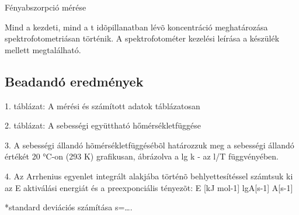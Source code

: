 \documentclass[a4paper, 12pt]{article}
\begin{document}
Fényabszorpció mérése


Mind a kezdeti, mind a t idõpillanatban lévõ koncentráció meghatározása spektrofotometriásan történik.
A spektrofotométer kezelési leírása a készülék mellett megtalálható.


\subsection{Beadandó eredmények}

1. táblázat: A mérési és számított adatok táblázatosan

2. táblázat: A sebességi együttható hőmérsékletfüggése

3. A sebességi állandó hõmérsékletfüggésébõl határozzuk meg a sebességi állandó értékét 20 °C-on (293 K) grafikusan, ábrázolva a lg k - az l/T függvényében.

4. Az Arrhenius egyenlet integrált alakjába történõ behlyettesítéssel számtsuk ki az E aktiválási energiát és a preexponciális tényezõt:
E [kJ mol-1]
lgA[s-1]
A[s-1]

*standard deviációs számítása
s=….
\end{document}
